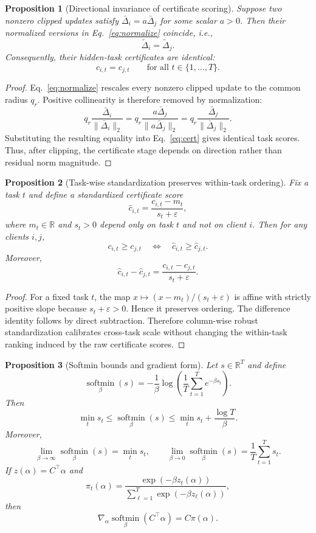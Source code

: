 \documentclass{article}
\newcommand{\R}{\mathbb{R}}
\newcommand{\softmin}{\operatorname*{softmin}}
\newtheorem{proposition}{Proposition}[section]
\begin{document}
\begin{proposition}[Directional invariance of certificate scoring]
\label{prop:directional-invariance}
Suppose two nonzero clipped updates satisfy $\bar{\Delta}_i = a \bar{\Delta}_j$ for some scalar $a>0$. Then their normalized versions in Eq.~\eqref{eq:normalize} coincide, i.e.,
\[
\tilde{\Delta}_i=\tilde{\Delta}_j.
\]
Consequently, their hidden-task certificates are identical:
\[
c_{i,t}=c_{j,t}\qquad \text{for all } t \in \{1,\dots,T\}.
\]
\end{proposition}

\begin{proof}
Eq.~\eqref{eq:normalize} rescales every nonzero clipped update to the common radius $q_r$. Positive collinearity is therefore removed by normalization:
\[
q_r\frac{\bar{\Delta}_i}{\|\bar{\Delta}_i\|_2}
=
q_r\frac{a\bar{\Delta}_j}{\|a\bar{\Delta}_j\|_2}
=
q_r\frac{\bar{\Delta}_j}{\|\bar{\Delta}_j\|_2}.
\]
Substituting the resulting equality into Eq.~\eqref{eq:cert} gives identical task scores. Thus, after clipping, the certificate stage depends on direction rather than residual norm magnitude.
\end{proof}

\begin{proposition}[Task-wise standardization preserves within-task ordering]
\label{prop:task-standardization}
Fix a task $t$ and define a standardized certificate score
\[
\hat{c}_{i,t}=\frac{c_{i,t}-m_t}{s_t+\varepsilon},
\]
where $m_t \in \R$ and $s_t>0$ depend only on task $t$ and not on client $i$. Then for any clients $i,j$,
\[
c_{i,t} \ge c_{j,t}
\quad \Longleftrightarrow \quad
\hat{c}_{i,t} \ge \hat{c}_{j,t}.
\]
Moreover,
\[
\hat{c}_{i,t}-\hat{c}_{j,t}
=
\frac{c_{i,t}-c_{j,t}}{s_t+\varepsilon}.
\]
\end{proposition}

\begin{proof}
For a fixed task $t$, the map $x \mapsto (x-m_t)/(s_t+\varepsilon)$ is affine with strictly positive slope because $s_t+\varepsilon>0$. Hence it preserves ordering. The difference identity follows by direct subtraction. Therefore column-wise robust standardization calibrates cross-task scale without changing the within-task ranking induced by the raw certificate scores.
\end{proof}

\begin{proposition}[Softmin bounds and gradient form]
\label{prop:softmin}
Let $s \in \R^T$ and define
\[
\softmin_{\beta}(s)
= -\frac{1}{\beta}\log\left(\frac{1}{T}\sum_{t=1}^T e^{-\beta s_t}\right).
\]
Then
\[
\min_t s_t \le \softmin_{\beta}(s) \le \min_t s_t + \frac{\log T}{\beta}.
\]
Moreover,
\[
\lim_{\beta \to \infty}\softmin_{\beta}(s)=\min_t s_t,
\qquad
\lim_{\beta \to 0}\softmin_{\beta}(s)=\frac{1}{T}\sum_{t=1}^T s_t.
\]
If $z(\alpha)=C^\top\alpha$ and
\[
\pi_t(\alpha)=\frac{\exp(-\beta z_t(\alpha))}{\sum_{\ell=1}^T \exp(-\beta z_\ell(\alpha))},
\]
then
\[
\nabla_\alpha \softmin_{\beta}(C^\top\alpha)=C\pi(\alpha).
\]
\end{proposition}
\end{document}
